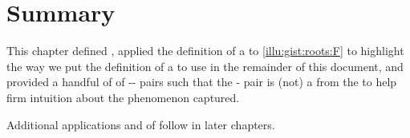 



\section*{Summary}


\begin{note}
  This chapter defined , applied the definition of a \fc{} to \autoref{illu:gist:roots:F} to highlight the way we put the definition of a \fc{} to use in the remainder of this document, and provided a handful of  of -- pairs such that the - pair is (not) a \fc{} from the \pool{} to help firm intuition about the phenomenon captured.

  Additional applications and  of  follow in later chapters.
\end{note}


